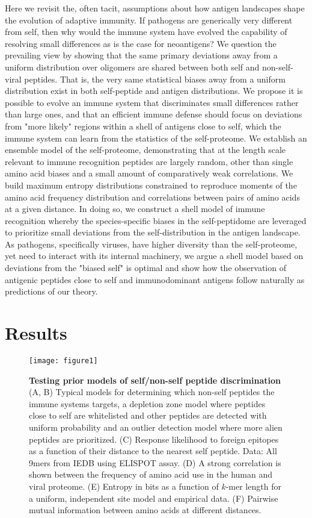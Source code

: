 \documentclass[superscriptaddress,twocolumn,pre]{revtex4}
\newcommand{\<}{\langle}
\renewcommand{\>}{\rangle}
\begin{document}
Here we revisit the, often tacit, assumptions about how antigen landscapes shape the evolution of adaptive immunity. If pathogens are generically very different from self, then why would the immune system have evolved the capability of resolving small differences as is the case for neoantigens? We question the prevailing view by showing that the same primary deviations away from a uniform distribution over oligomers are shared between both self and non-self-viral peptides. That is, the very same statistical biases away from a uniform distribution exist in both self-peptide and antigen distributions. We propose it is possible to evolve an immune system that discriminates small differences rather than large ones, and that an efficient immune defense should focus on deviations from "more likely" regions within a shell of antigens close to self, which the immune system can learn from the statistics of the self-proteome. We establish an ensemble model of the self-proteome, demonstrating that at the length scale relevant to immune recognition peptides are largely random, other than single amino acid biases and a small amount of comparatively weak correlations. We build maximum entropy distributions constrained to reproduce moments of the amino acid frequency distribution and correlations between pairs of amino acids at a given distance. In doing so, we construct a shell model of immune recognition whereby the species-specific biases in the self-peptidome are leveraged to prioritize small deviations from the self-distribution in the antigen landscape. As pathogens, specifically viruses, have higher diversity than the self-proteome, yet need to interact with its internal machinery, we argue a shell model based on deviations from the "biased self" is optimal and show how the observation of antigenic peptides close to self and immunodominant antigens follow naturally as predictions of our theory. 



\section{Results}


\begin{figure*}
     \texttt{[image: figure1]}
     \caption{
         {\bf Testing prior models of self/non-self peptide discrimination}
         (A, B) Typical models for determining which non-self peptides the immune systems targets, a depletion zone model where peptides close to self are whitelisted and other peptides are detected with uniform probability and an outlier detection model where more alien peptides are prioritized.
         (C) Response likelihood to foreign epitopes as a function of their distance to the nearest self peptide. Data: All 9mers from IEDB using ELISPOT assay.
         (D) A strong correlation is shown between the frequency of amino acid use in the human and viral proteome.
         (E) Entropy in bits as a function of $k$-mer length for a uniform, independent site model and empirical data.
         (F) Pairwise mutual information between amino acids at different distances. 
     \label{figure1}
     }
\end{figure*}
\end{document}
